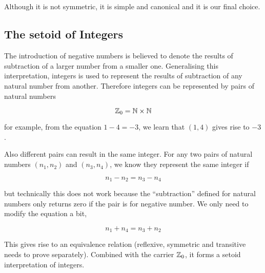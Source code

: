 \begin{code}
\\
\>  \AgdaSymbol{:}  \<%
\\
\>[0]\<[2]%
\>[2]\AgdaInductiveConstructor{+\_} \<[8]%
\>[8]\AgdaSymbol{:}   \<%
\\
\>[0]\<[2]%
\>[2] \AgdaSymbol{:}   \<%
\\
\>\<\end{code}

Although it is not symmetric, it is simple and canonical and it is our
final choice.

\subsection{The setoid of Integers}

The introduction of negative numbers is believed to denote the results
of subtraction of a larger number from a smaller one. Generalising this interpretation,
integers is used to represent the results of subtraction of any
natural number from another. 
Therefore integers can be represented by pairs of natural numbers

$$\mathbb{Z}_0=\mathbb{N} \times \mathbb{N}$$

for example, from the equation $1 - 4 = - 3$, we learn that $(1,4)$ gives rise to $- 3$.

Also different pairs can result in the same integer.
For any two pairs of natural
numbers $(n_1, n_2)$ and $(n_3, n_4)$, we know they represent the same
integer if

$$ n_1 - n_2 = n_3 - n_4$$

but technically this does not work because the ``subtraction'' defined for natural
numbers only returns zero if the pair is for negative number. We only
need to modify the equation a bit,

$$ n_1 + n_4 = n_3 + n_2$$

This gives rise to an equivalence relation (reflexive, symmetric and
transitive needs to prove separately). Combined with the carrier
$\mathbb{Z}_0$, it forms a setoid interpretation of integers.

